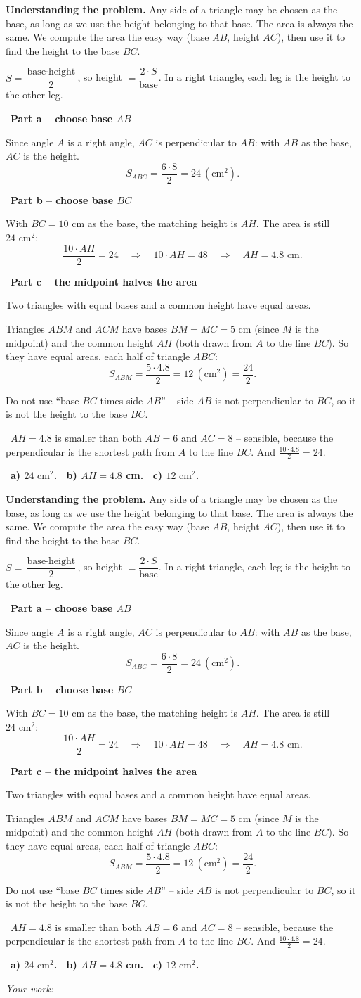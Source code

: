 \documentclass[11pt]{article}
\newif\ifsol \soltrue
\providecommand{\AnsWord}{Đáp số}
\newcommand{\StuProb}[2]{\begin{probboxS}{#1}{#2}\StuProbBody\end{probboxS}}
\newcommand{\ans}[1]{\par\smallskip{\bfseries\color{tmGreen!88!black}\AnsWord:}\ {\bfseries\color{AnsRed}#1}\par}
\newcommand{\probsol}[1]{%
  \begin{lrbox}{\solmeasure}\begin{minipage}{\dimexpr\linewidth-24pt\relax}#1\end{minipage}\end{lrbox}%
  \ifsol
    \begin{solbox}#1\end{solbox}%
  \else
    \setlength{\solht}{\dimexpr\ht\solmeasure+\dp\solmeasure+0.85cm\relax}%
    \ifdim\solht<1.35cm\setlength{\solht}{1.35cm}\fi
    \ifdim\solht>\StudentMaxWork\setlength{\solht}{\StudentMaxWork}\fi
    \par\noindent\begin{minipage}{\linewidth}%
    \expandafter\StuProb\StuProbArgs
    \begin{tcolorbox}[colback=white,colframe=Line,boxrule=0.8pt,arc=5pt,
      left=8pt,right=8pt,top=4pt,bottom=4pt,height=\solht]{\footnotesize\color{Slate}\itshape\WorkWord}\end{tcolorbox}%
    \end{minipage}\par\medskip
  \fi}
\newlength{\StudentMaxWork}\setlength{\StudentMaxWork}{4.5cm}
\newcommand{\step}[2]{\par\smallskip\noindent{\bfseries\color{tmBlue!85!black}\StepWord~#1.}\ {\bfseries #2}\par\nopagebreak}
\newcommand{\verify}[1]{\par\smallskip\noindent{\bfseries\color{tmGreen!80!black}\faCheckCircle\ \CheckWord}\ #1\par}
\def\WorkWord{Your work:}
\def\AnsWord{Answer}
\def\StepWord{Step}
\def\CheckWord{Check:}
\begin{document}
\probsol{
\textbf{Understanding the problem.} Any side of a triangle may be chosen as the base, as long as we use the height belonging to that base. The area is always the same. We compute the area the easy way (base $AB$, height $AC$), then use it to find the height to the base $BC$.
\begin{recallbox}$S=\dfrac{\text{base}\cdot\text{height}}{2}$, so height $=\dfrac{2\cdot S}{\text{base}}$. In a right triangle, each leg is the height to the other leg.\end{recallbox}
\step{1}{Part a -- choose base $AB$}
Since angle $A$ is a right angle, $AC$ is perpendicular to $AB$: with $AB$ as the base, $AC$ is the height.
\[ S_{ABC}=\frac{6\cdot8}{2}=24\ (\text{cm}^2). \]

\step{2}{Part b -- choose base $BC$}
With $BC=10$ cm as the base, the matching height is $AH$. The area is still $24\text{ cm}^2$:
\[ \frac{10\cdot AH}{2}=24\quad\Rightarrow\quad 10\cdot AH=48\quad\Rightarrow\quad AH=4.8\text{ cm}. \]

\step{3}{Part c -- the midpoint halves the area}
\begin{recallbox}Two triangles with equal bases and a common height have equal areas.\end{recallbox}
Triangles $ABM$ and $ACM$ have bases $BM=MC=5$ cm (since $M$ is the midpoint) and the common height $AH$ (both drawn from $A$ to the line $BC$). So they have equal areas, each half of triangle $ABC$:
\[ S_{ABM}=\frac{5\cdot4.8}{2}=12\ (\text{cm}^2)=\frac{24}{2}. \]
\begin{warnbox}Do not use ``base $BC$ times side $AB$'' -- side $AB$ is not perpendicular to $BC$, so it is not the height to the base $BC$.\end{warnbox}
\verify{$AH=4.8$ is smaller than both $AB=6$ and $AC=8$ -- sensible, because the perpendicular is the shortest path from $A$ to the line $BC$. And $\frac{10\cdot4.8}{2}=24$.}
\ans{a) $24\text{ cm}^2$. \ b) $AH=4.8$ cm. \ c) $12\text{ cm}^2$.}
}

\providecommand{\tbGrid}[4]{\begin{tikzpicture}[baseline=0.2cm,x=0.5cm,y=0.5cm]
  \draw[Ink,line width=0.7pt] (0,0) grid[step=1] (2,2);
  \node[font=\sffamily\bfseries,text=tmBlue!80!black,inner sep=0pt,#4] at (#1,#2) {#3};\end{tikzpicture}}
\providecommand{\rvbbG}[6]{\draw[Ink,line width=0.7pt] (#1,#2) rectangle ++(1,1)
  ({#1+0.5},#2)--++(0,1) (#1,{#2+0.5})--++(1,0);
  \node[font=\sffamily\bfseries,text=tmBlue!80!black,inner sep=0pt,#6] at ({#1+#3},{#2+#4}) {#5};}
\end{document}
